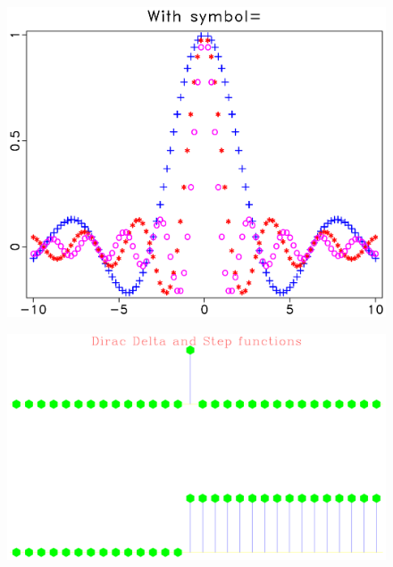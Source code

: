 \begin{frame}
  \begin{figure}
  \includegraphics[scale=0.25]{plot/Fig/mpsincs.pdf}
  \end{figure}
\end{frame}

\begin{frame}
  \begin{figure}
  \includegraphics[scale=0.25]{plot/Fig/dots.pdf}
  \end{figure}
\end{frame}

